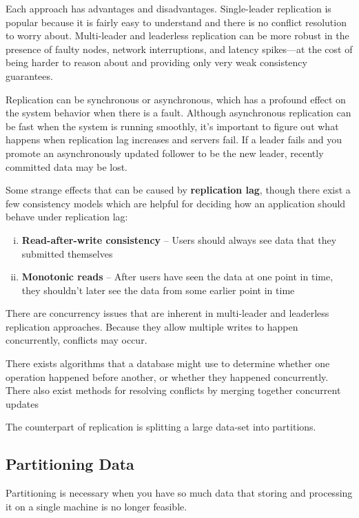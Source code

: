 \documentclass{article}
\begin{document}
    Each approach has advantages and disadvantages. Single-leader replication is popular because it is fairly easy to understand and there is no conflict resolution to worry about. Multi-leader and leaderless replication can be more robust in the presence of faulty nodes, network interruptions, and latency spikes—at the cost of being harder to reason about and providing only very weak consistency guarantees.
    
    Replication can be synchronous or asynchronous, which has a profound effect on the system behavior when there is a fault. Although asynchronous replication can be fast when the system is running smoothly, it’s important to figure out what happens when replication lag increases and servers fail. If a leader fails and you promote an asynchronously updated follower to be the new leader, recently committed data may be lost.
    
    Some strange effects that can be caused by \textbf{replication lag}, though there exist a few consistency models which are helpful for deciding how an application should behave under replication lag:
    
    \begin{enumerate}[i.]
        \item \textbf{Read-after-write consistency} -- Users should always see data that they submitted themselves
        \item \textbf{Monotonic reads} --  After users have seen the data at one point in time, they shouldn’t later see the data from some earlier point in time
    \end{enumerate}
    
    There are concurrency issues that are inherent in multi-leader and leaderless replication approaches. Because they allow multiple writes to happen concurrently, conflicts may occur.
    
    There exists algorithms that a database might use to determine whether one operation happened before another, or whether they happened concurrently. There also exist methods for resolving conflicts by merging together concurrent updates
    
    The counterpart of replication is splitting a large data-set into partitions.
    
    \subsection{Partitioning Data}
    Partitioning is necessary when you have so much data that storing and processing it on a single machine is no longer feasible.
    
\end{document}
